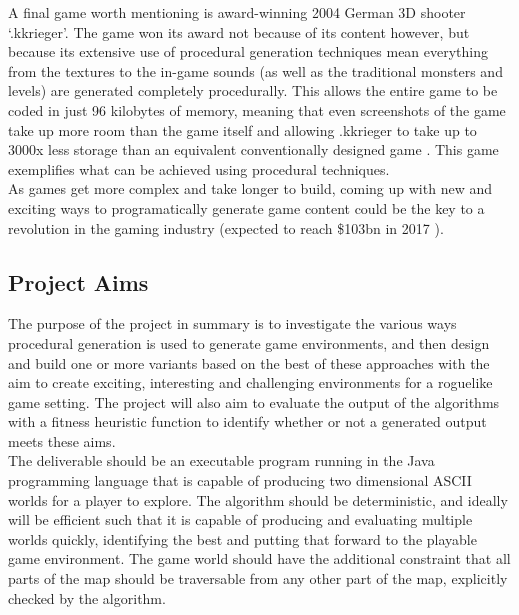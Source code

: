 \documentclass[12pt,a4paper]{article}
\begin{document}
A final game worth mentioning is award-winning 2004 German 3D shooter `.kkrieger'. The game won its award not because of its content however, but because its extensive use of procedural generation techniques mean everything from the textures to the in-game sounds (as well as the traditional monsters and levels) are generated completely procedurally. This allows the entire game to be coded in just 96 kilobytes of memory, meaning that even screenshots of the game take up more room than the game itself and allowing .kkrieger to take up to 3000x less storage than an equivalent conventionally designed game \cite{kkrieger}. This game exemplifies what can be achieved using procedural techniques.\\

As games get more complex and take longer to build, coming up with new and exciting ways to programatically generate game content could be the key to a revolution in the gaming industry (expected to reach \$103bn in 2017 \cite{newzoo}).







\subsection{Project Aims}

The purpose of the project in summary is to investigate the various ways procedural generation is used to generate game environments, and then design and build one or more variants based on the best of these approaches with the aim to create exciting, interesting and challenging environments for a roguelike game setting. The project will also aim to evaluate the output of the algorithms with a fitness heuristic function to identify whether or not a generated output meets these aims. \\

The deliverable should be an executable program running in the Java programming language that is capable of producing two dimensional ASCII worlds for a player to explore. The algorithm should be deterministic, and ideally will be efficient such that it is capable of producing and evaluating multiple worlds quickly, identifying the best and putting that forward to the playable game environment. The game world should have the additional constraint that all parts of the map should be traversable from any other part of the map, explicitly checked by the algorithm. 
\end{document}
